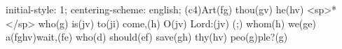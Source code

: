 initial-style: 1;
centering-scheme: english;
(c4)Art(fg) thou(gv) he(hv) <sp>*</sp> who(g) is(jv) to(ji) come,(h) O(jv) Lord:(jv) (;) whom(h) we(ge) a(fghv)wait,(fe) who(d) should(ef) save(gh) thy(hv) peo(g)ple?(g)
